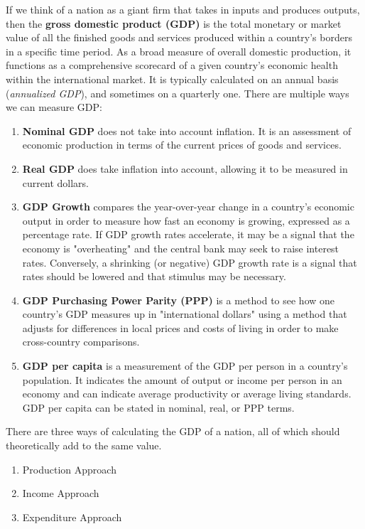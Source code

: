 \documentclass{article}
\begin{document}
  \begin{definition}
    If we think of a nation as a giant firm that takes in inputs and produces outputs, then the \textbf{gross domestic product (GDP)} is the total monetary or market value of all the finished goods and services produced within a country's borders in a specific time period. As a broad measure of overall domestic production, it functions as a comprehensive scorecard of a given country's economic health within the international market. It is typically calculated on an annual basis (\textit{annualized GDP}), and sometimes on a quarterly one. There are multiple ways we can measure GDP: 
    \begin{enumerate}
      \item \textbf{Nominal GDP} does not take into account inflation. It is an assessment of economic production in terms of the current prices of goods and services.  
      \item \textbf{Real GDP} does take inflation into account, allowing it to be measured in current dollars. 
      \item \textbf{GDP Growth} compares the year-over-year change in a country's economic output in order to measure how fast an economy is growing, expressed as a percentage rate. If GDP growth rates accelerate, it may be a signal that the economy is "overheating" and the central bank may seek to raise interest rates. Conversely, a shrinking (or negative) GDP growth rate is a signal that rates should be lowered and that stimulus may be necessary. 
      \item \textbf{GDP Purchasing Power Parity (PPP)} is a method to see how one country's GDP measures up in "international dollars" using a method that adjusts for differences in local prices and costs of living in order to make cross-country comparisons. 
      \item \textbf{GDP per capita} is a measurement of the GDP per person in a country's population. It indicates the amount of output or income per person in an economy and can indicate average productivity or average living standards. GDP per capita can be stated in nominal, real, or PPP terms. 
    \end{enumerate}
  \end{definition}

  There are three ways of calculating the GDP of a nation, all of which should theoretically add to the same value. 
  \begin{enumerate}
    \item Production Approach
    \item Income Approach
    \item Expenditure Approach
  \end{enumerate}
\end{document}
